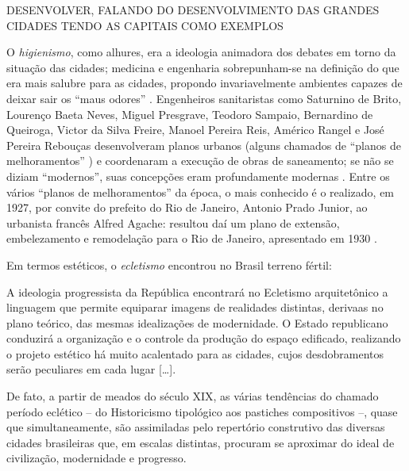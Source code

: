DESENVOLVER, FALANDO DO DESENVOLVIMENTO DAS GRANDES CIDADES TENDO AS CAPITAIS COMO EXEMPLOS

O \textit{higienismo}, como alhures, era a ideologia animadora dos debates em torno da situação das cidades; medicina e engenharia sobrepunham-se na definição do que era mais salubre para as cidades, propondo invariavelmente ambientes capazes de deixar sair os ``maus odores'' \cite{CAPONI2002}. Engenheiros sanitaristas como Saturnino de Brito, Lourenço Baeta Neves, Miguel Presgrave, Teodoro Sampaio, Bernardino de Queiroga, Victor da Silva Freire, Manoel Pereira Reis, Américo Rangel e José Pereira Rebouças desenvolveram planos urbanos (alguns chamados de ``planos de melhoramentos'' \cite{leme_urbasp_1991}) e coordenaram a execução de obras de saneamento; se não se diziam ``modernos'', suas concepções eram profundamente modernas \cite{andrade_saturnino_1991}. Entre os vários ``planos de melhoramentos'' da época, o mais conhecido é o realizado, em 1927, por convite do prefeito do Rio de Janeiro, Antonio Prado Junior, ao urbanista francês Alfred Agache: resultou daí um plano de extensão, embelezamento e remodelação para o Rio de Janeiro, apresentado em 1930 \cite{pinheiro_capiconsul_2009}. 

Em termos estéticos, o \textit{ecletismo} encontrou no Brasil terreno fértil:

\begin{citacao}
A ideologia progressista da República encontrará no Ecletismo arquitetônico a linguagem que permite equiparar imagens de realidades distintas, derivaas no plano teórico, das mesmas idealizações de modernidade. O Estado republicano conduzirá a organização e o controle da produção do espaço edificado, realizando o projeto estético há muito acalentado para as cidades, cujos desdobramentos serão peculiares em cada lugar [\dots].

De fato, a partir de meados do século XIX, as várias tendências do chamado período eclético -- do Historicismo tipológico aos pastiches compositivos --, quase que simultaneamente, são assimiladas pelo repertório construtivo das diversas cidades brasileiras que, em escalas distintas, procuram se aproximar do ideal de civilização, modernidade e progresso. \cite[p.~259-260]{almeida_vitrinescomercio_2014}
\end{citacao}